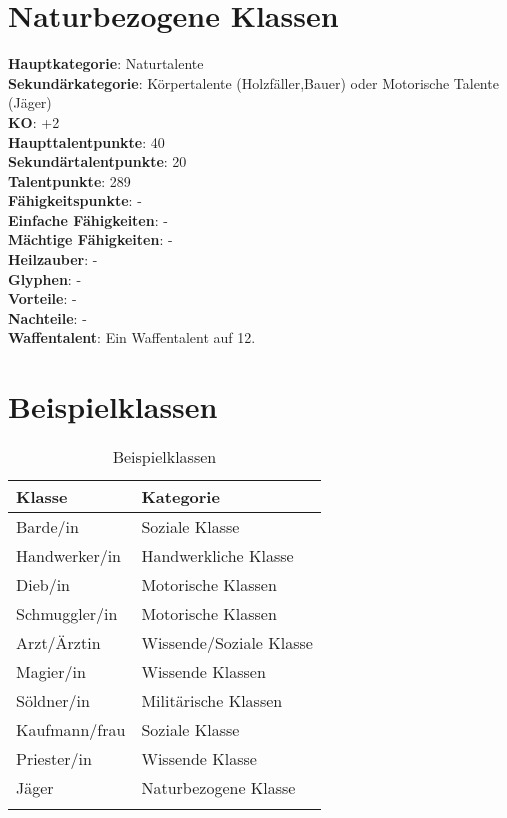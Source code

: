 \section{Naturbezogene Klassen}
\textbf{Hauptkategorie}: Naturtalente \\
\textbf{Sekundärkategorie}: Körpertalente (Holzfäller,Bauer) oder Motorische Talente (Jäger) \\
\textbf{KO}: +2 \\
\textbf{Haupttalentpunkte}: 40 \\
\textbf{Sekundärtalentpunkte}: 20 \\
\textbf{Talentpunkte}: 289 \\
\textbf{Fähigkeitspunkte}: - \\
\textbf{Einfache Fähigkeiten}: - \\
\textbf{Mächtige Fähigkeiten}: - \\
\textbf{Heilzauber}: - \\
\textbf{Glyphen}: - \\
\textbf{Vorteile}: - \\
\textbf{Nachteile}: - \\
\textbf{Waffentalent}: Ein Waffentalent auf 12.

\section{Beispielklassen}
\begin{longtable}{|l|l|}
\hline
\textbf{Klasse} & \textbf{Kategorie} \\ \hline

Barde/in & Soziale Klasse \\ \hline
Handwerker/in & Handwerkliche Klasse \\ \hline
Dieb/in & Motorische Klassen \\ \hline
Schmuggler/in & Motorische Klassen \\ \hline
Arzt/Ärztin & Wissende/Soziale Klasse \\ \hline
Magier/in & Wissende Klassen \\ \hline
Söldner/in & Militärische Klassen \\ \hline
Kaufmann/frau & Soziale Klasse \\ \hline
Priester/in & Wissende Klasse \\ \hline
Jäger & Naturbezogene Klasse \\ \hline

\caption{Beispielklassen}
\label{tab:Beispielklassen}
\end{longtable}
